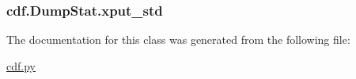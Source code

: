 \hypertarget{classcdf_1_1_dump_stat_a2736270ac68b05550848435b6a291b3e}{
\subsubsection[{xput\-\_\-std}]{\setlength{\rightskip}{0pt plus 5cm}cdf.\-Dump\-Stat.\-xput\-\_\-std}}\label{classcdf_1_1_dump_stat_a2736270ac68b05550848435b6a291b3e}


The documentation for this class was generated from the following file\-:\begin{DoxyCompactItemize}
\item 
\hyperlink{cdf_8py}{cdf.\-py}\end{DoxyCompactItemize}
